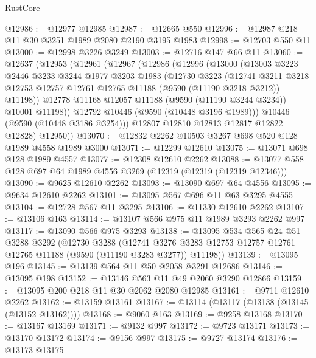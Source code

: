 \begin{lexlean}{RustCore}
\begin{coremodule}
@12986 := @12977 @12985
@12987 := @12665 @550
@12996 := @12987 @218 @11 @30 @3251 @1989 @2080 @2190 @3195 @1983
@12998 := @12703 @550 @11
@13000 := @12998 @3226 @3249
@13003 := @12716 @147 @66 @11
@13060 := @12637
    (@12953
      (@12961
        (@12967
          (@12986
            (@12996
              (@13000
                (@13003
                  @3223
                  @2446
                  @3233
                  @3244
                  @1977
                  @3203
                  @1983
                  (@12730
                    @3223
                    (@12741
                      @3211
                      @3218
                      @12753
                      @12757
                      @12761
                      @12765
                      @11188
                      (@9590 (@11190 @3218 @3212))
                      @11198))
                  @12778
                  @11168
                  @12057
                  @11188
                  (@9590 (@11190 @3244 @3234))
                  @10001
                  @11198))
              @12792
              @10446
              (@9590 (@10448 @3196 @1989)))
            @10446
            (@9590 (@10448 @3186 @3254)))
          @12807
          @12810
          @12813
          @12817
          @12822
          @12828)
        @12950))
@13070 := @12832 @2262 @10503 @3267 @698 @520 @128 @1989 @4558 @1989 @3000
@13071 := @12299 @12610
@13075 := @13071 @698 @128 @1989 @4557
@13077 := @12308 @12610 @2262
@13088 := @13077 @558 @128 @697 @64 @1989 @4556 @3269 (@12319 (@12319 (@12319 @12346)))
@13090 := @9625 @12610 @2262
@13093 := @13090 @697 @64 @4556
@13095 := @9634 @12610 @2262
@13101 := @13095 @567 @696 @11 @63 @3295 @4555
@13104 := @12728 @567 @11 @3295
@13106 := @11330 @12610 @2262
@13107 := @13106 @163
@13114 := @13107 @566 @975 @11 @1989 @3293 @2262 @997
@13117 := @13090 @566 @975 @3293
@13138 := @13095
    @534
    @565
    @24
    @51
    @3288
    @3292
    (@12730
      @3288
      (@12741 @3276 @3283 @12753 @12757 @12761 @12765 @11188 (@9590 (@11190 @3283 @3277)) @11198))
@13139 := @13095 @196
@13145 := @13139 @564 @11 @50 @2058 @3291 @12686
@13146 := @13095 @198
@13152 := @13146 @563 @11 @49 @2060 @3290 @12866
@13159 := @13095 @200 @218 @11 @30 @2062 @2080 @12985
@13161 := @9711 @12610 @2262
@13162 := @13159 @13161
@13167 := @13114 (@13117 (@13138 (@13145 (@13152 @13162))))
@13168 := @9060 @163
@13169 := @9258 @13168
@13170 := @13167 @13169
@13171 := @9132 @997
@13172 := @9723 @13171
@13173 := @13170 @13172
@13174 := @9156 @997
@13175 := @9727 @13174
@13176 := @13173 @13175

\end{coremodule}
\end{lexlean}
